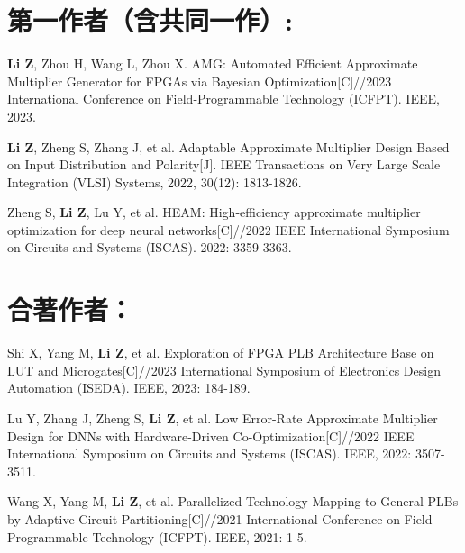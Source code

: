 \section*{第一作者（含共同一作）:}
\begin{enumerate}[label={[\arabic*]}]
  \item \textbf{Li Z}, Zhou H, Wang L, Zhou X. AMG: Automated Efficient Approximate Multiplier Generator for FPGAs via Bayesian Optimization[C]//2023 International Conference on Field-Programmable Technology (ICFPT). IEEE, 2023.
  \item \textbf{Li Z}, Zheng S, Zhang J, et al. Adaptable Approximate Multiplier Design Based on Input Distribution and Polarity[J]. IEEE Transactions on Very Large Scale Integration (VLSI) Systems, 2022, 30(12): 1813-1826.
  \item Zheng S, \textbf{Li Z}, Lu Y, et al. HEAM: High-efficiency approximate multiplier optimization for deep neural networks[C]//2022 IEEE International Symposium on Circuits and Systems (ISCAS). 2022: 3359-3363.
\end{enumerate}

\vspace{5pt}
\section*{合著作者：}
\begin{enumerate}[label={[\arabic*]}]
  \item Shi X, Yang M, \textbf{Li Z}, et al. Exploration of FPGA PLB Architecture Base on LUT and Microgates[C]//2023 International Symposium of Electronics Design Automation (ISEDA). IEEE, 2023: 184-189.
  \item Lu Y, Zhang J, Zheng S, \textbf{Li Z}, et al. Low Error-Rate Approximate Multiplier Design for DNNs with Hardware-Driven Co-Optimization[C]//2022 IEEE International Symposium on Circuits and Systems (ISCAS). IEEE, 2022: 3507-3511.
  \item Wang X, Yang M, \textbf{Li Z}, et al. Parallelized Technology Mapping to General PLBs by Adaptive Circuit Partitioning[C]//2021 International Conference on Field-Programmable Technology (ICFPT). IEEE, 2021: 1-5.
\end{enumerate}

\fi